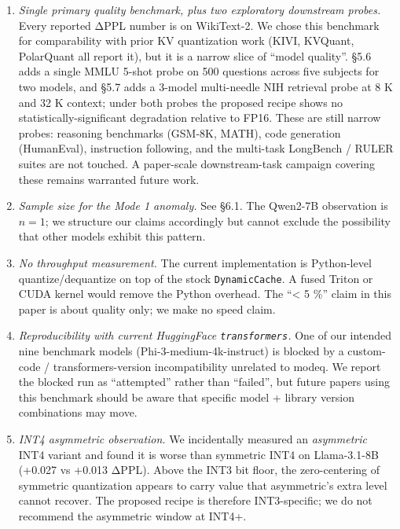 \documentclass[
]{article}
\begin{document}
\begin{enumerate}
\def\labelenumi{\arabic{enumi}.}
\item
  \emph{Single primary quality benchmark, plus two exploratory
  downstream probes.} Every reported ΔPPL number is on WikiText-2. We
  chose this benchmark for comparability with prior KV quantization work
  (KIVI, KVQuant, PolarQuant all report it), but it is a narrow slice of
  ``model quality''. §5.6 adds a single MMLU 5-shot probe on 500
  questions across five subjects for two models, and §5.7 adds a 3-model
  multi-needle NIH retrieval probe at 8 K and 32 K context; under both
  probes the proposed recipe shows no statistically-significant
  degradation relative to FP16. These are still narrow probes: reasoning
  benchmarks (GSM-8K, MATH), code generation (HumanEval), instruction
  following, and the multi-task LongBench / RULER suites are not
  touched. A paper-scale downstream-task campaign covering these remains
  warranted future work.
\item
  \emph{Sample size for the Mode 1 anomaly.} See §6.1. The Qwen2-7B
  observation is \(n = 1\); we structure our claims accordingly but
  cannot exclude the possibility that other models exhibit this pattern.
\item
  \emph{No throughput measurement.} The current implementation is
  Python-level quantize/dequantize on top of the stock
  \texttt{DynamicCache}. A fused Triton or CUDA kernel would remove the
  Python overhead. The ``\textless{} 5 \%'' claim in this paper is about
  quality only; we make no speed claim.
\item
  \emph{Reproducibility with current HuggingFace \texttt{transformers}.}
  One of our intended nine benchmark models (Phi-3-medium-4k-instruct)
  is blocked by a custom-code / transformers-version incompatibility
  unrelated to modeq. We report the blocked run as ``attempted'' rather
  than ``failed'', but future papers using this benchmark should be
  aware that specific model + library version combinations may move.
\item
  \emph{INT4 asymmetric observation.} We incidentally measured an
  \emph{asymmetric} INT4 variant and found it is worse than symmetric
  INT4 on Llama-3.1-8B (+0.027 vs +0.013 ΔPPL). Above the INT3 bit
  floor, the zero-centering of symmetric quantization appears to carry
  value that asymmetric's extra level cannot recover. The proposed
  recipe is therefore INT3-specific; we do not recommend the asymmetric
  window at INT4+.
\end{enumerate}
\end{document}
